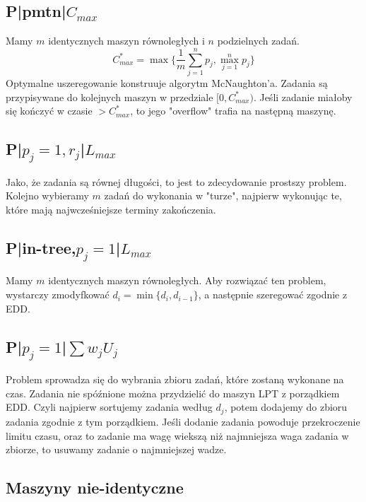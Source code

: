 \documentclass{../notatki}
\begin{document}
\subsection{P|pmtn|\texorpdfstring{$C_{max}$}{Cmax}}

Mamy $m$ identycznych maszyn równoległych i $n$ podzielnych zadań.
$$
C^*_{max} = \max\{\frac{1}{m}\sum_{j=1}^n p_j, \max_{j=1}^n p_j\}
$$
Optymalne uszeregowanie konstruuje algorytm McNaughton'a. Zadania są
przypisywane do kolejnych maszyn w przedziale $[0, C^*_{max})$. Jeśli zadanie
miałoby się kończyć w czasie $> C^*_{max}$, to jego "overflow" trafia na
następną maszynę.

\subsection{P|\texorpdfstring{$p_j=1,r_j$}{pj=1,rj}|\texorpdfstring{$L_{max}$}{Lmax}}

Jako, że zadania są równej długości, to jest to zdecydowanie prostszy
problem. Kolejno wybieramy $m$ zadań do wykonania w "turze", najpierw wykonując
te, które mają najwcześniejsze terminy zakończenia.

\subsection{P|in-tree,\texorpdfstring{$p_j =
1$}{pj=1}|\texorpdfstring{$L_{max}$}{Lmax}}

Mamy $m$ identycznych maszyn równoległych. Aby rozwiązać ten problem,
wystarczy zmodyfkować $d_i = \min\{d_i, d_{i - 1}\}$, a następnie
szeregować zgodnie z EDD.

\subsection{P|\texorpdfstring{$p_j=1$}{pj=1}|\texorpdfstring{$\sum
w_jU_j$}{sum wjUj}}

Problem sprowadza się do wybrania zbioru zadań, które zostaną wykonane na czas.
Zadania nie spóźnione można przydzielić do maszyn LPT z porządkiem EDD.
Czyli najpierw sortujemy zadania według $d_j$, potem dodajemy do zbioru zadania
zgodnie z tym porządkiem. Jeśli dodanie zadania powoduje przekroczenie limitu
czasu, oraz to zadanie ma wagę wiekszą niż najmniejsza waga zadania w
zbiorze, to usuwamy zadanie o najmniejszej wadze.

\subsection{Maszyny nie-identyczne}
\end{document}
